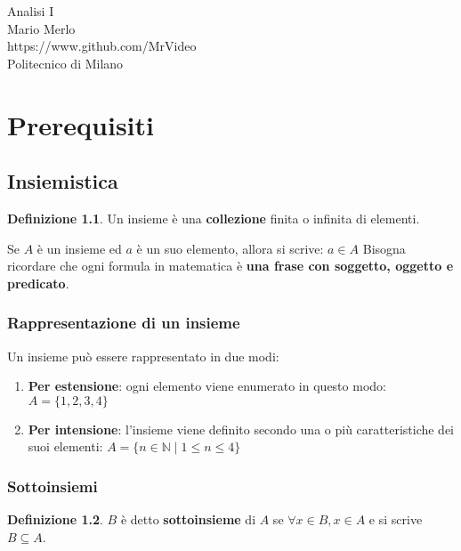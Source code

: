 \documentclass[a4paper, 12pt]{report}
\theoremstyle{definition}
\newtheorem{definition}{Definizione}[chapter]
\theoremstyle{remark}
\theoremstyle{plain}
\newcommand{\N}{\mathbb{N}}
\begin{document}
\begin{titlepage}
    \begin{center}
        \vspace*{5cm}
        \Huge{Analisi I}\\[1cm]
        \Large{Mario Merlo}\\
        \Large{https://www.github.com/MrVideo}\\
        \Large{Politecnico di Milano}\\[7,5cm]
    \end{center}
    \doclicenseThis
\end{titlepage}

\chapter{Prerequisiti}

\section{Insiemistica}

\begin{definition}
    Un insieme è una \textbf{collezione} finita o infinita di elementi.
\end{definition}

Se $A$ è un insieme ed $a$ è un suo elemento, allora si scrive: $a \in A$
Bisogna ricordare che ogni formula in matematica è \textbf{una frase con soggetto, oggetto e predicato}.

\subsection{Rappresentazione di un insieme}

Un insieme può essere rappresentato in due modi:
\begin{enumerate}
    \item \textbf{Per estensione}: ogni elemento viene enumerato in questo modo: $A = \{1, 2, 3, 4\}$
    \item \textbf{Per intensione}: l'insieme viene definito secondo una o più caratteristiche dei suoi elementi: $A = \{n \in \N \mid 1 \leq n \leq 4\}$
\end{enumerate}

\subsection{Sottoinsiemi}

\begin{definition}
    $B$ è detto \textbf{sottoinsieme} di $A$ se $\forall x \in B, x \in A$ e si scrive $B \subseteq A$.
\end{definition}
\end{document}
